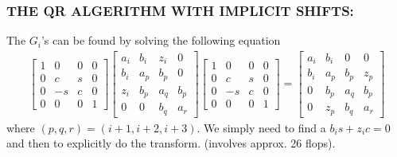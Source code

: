 \documentclass[a4paper,8pt]{beamer} %
\newcommand{\smatrix}[1]{\left[\begin{matrix} #1 \end{matrix}\right]}
\begin{document}
\begin{frame} \frametitle{THE QR ALGERITHM WITH IMPLICIT SHIFTS:} %
The $G_i$'s can be found by solving the following equation
\begin{align}
\smatrix{
1 & 0 & 0 & 0 \\
0 & c & s & 0 \\
0 & -s & c & 0 \\
0 & 0 & 0 & 1 
}
\smatrix{
a_i& b_i & z_i & 0 \\
b_i & a_p & b_p & 0 \\
z_i & b_p & a_q & b_p \\
0 & 0 & b_q & a_r 
}
\smatrix{
1 & 0 & 0 & 0 \\
0 & c & s & 0 \\
0 & -s & c & 0 \\
0 & 0 & 0 & 1 
}
=
\smatrix{
a_i& b_i & 0 & 0 \\
b_i & a_p & b_p & z_p \\
0 & b_p & a_q & b_p \\
0 & z_p & b_q & a_r 
}
\end{align}
where $(p,q,r)=(i+1, i+2, i+3)$. We simply need to find a $b_is+z_ic = 0$
and then to explicitly do the transform. (involves approx. 26 flops).
\end{frame}%
\end{document}
